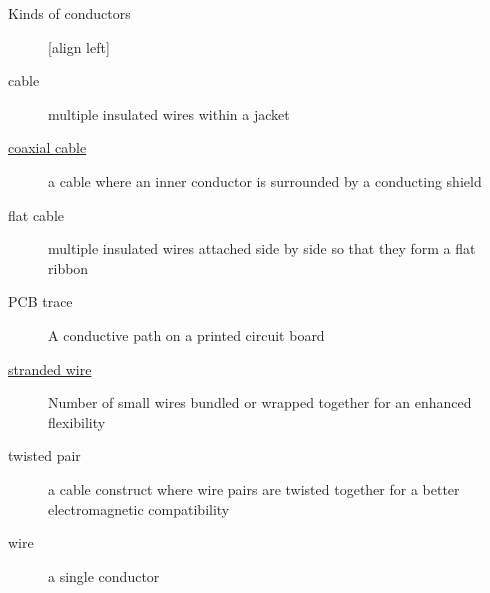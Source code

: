 \documentclass{beamer}
\begin{document}
\begin{frame}{Kinds of conductors}
 \begin{description}
  [align left]
  \item[cable] multiple insulated wires within a jacket
  \item[\hyperlink{coaxial}{coaxial cable}] a cable where an inner conductor is surrounded by a conducting shield
  \item[flat cable] multiple insulated wires attached side by side so that they form a flat ribbon
  \item[PCB trace] A conductive path on a printed circuit board
  \item[\hyperlink{fatique}{stranded wire}] Number of small wires bundled or wrapped together for an enhanced flexibility
  \item[twisted pair] a cable construct where wire pairs are twisted together for a better electromagnetic compatibility
  \item[wire] a single conductor
 \end{description}
\end{frame}
\end{document}
